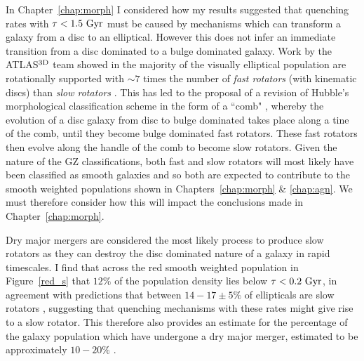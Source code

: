 In Chapter~\ref{chap:morph} I considered how my results suggested that quenching rates with $\tau < 1.5~\rm{Gyr}$ must be caused by mechanisms which can transform a galaxy from a disc to an elliptical. However this does not infer an immediate transition from a disc dominated to a bulge dominated galaxy. Work by the \textsc{ATLAS}$^{\rm{3D}}$ team \citep{cappellari11} showed in the majority of the visually elliptical population are rotationally supported \citep{emsellem11} with $\sim7$ times the number of \emph{fast rotators} (with kinematic discs) than \emph{slow rotators} \citep[with dispersion dominated kinematics see][]{cappellari07, emsellem07}.  This has led to the proposal of a revision of Hubble's morphological classification scheme in the form of a ``comb" \citep[see Figure 24 of the review paper by]{cappellari16}, whereby the evolution of a disc galaxy from disc to bulge dominated takes place along a tine of the comb, until they become bulge dominated fast rotators. These fast rotators then evolve along the handle of the comb to become slow rotators. Given the nature of the GZ classifications, both fast and slow rotators will most likely have been classified as smooth galaxies and so both are expected to contribute to the smooth weighted populations shown in Chapters~\ref{chap:morph} \& \ref{chap:agn}. We must therefore consider how this will impact the conclusions made in Chapter~\ref{chap:morph}. 

Dry major mergers are considered the most likely process to produce slow rotators \citep{duc11, naab14} as they can destroy the disc dominated nature of a galaxy \citep{toomre72} in rapid timescales. I find that across the red smooth weighted population in Figure~\ref{red_s} that $12\%$ of the population density lies below $\tau <0.2~\rm{Gyr}$, in agreement with predictions that between $14-17\pm5\%$ of ellipticals are slow rotators \citep{emsellem11, stott16}, suggesting that quenching mechanisms with these rates might give rise to a slow rotator. This therefore also provides an estimate for the percentage of the galaxy population which have undergone a dry major merger, estimated to be approximately $10-20\%$ \citep[since $z\sim1$;][]{khochfar09}.

